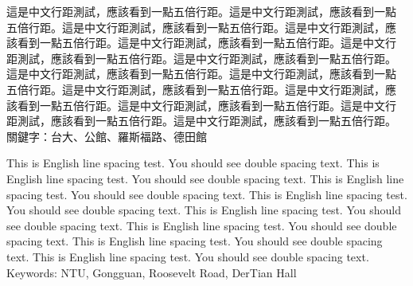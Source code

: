 \begin{abstractzh}
這是中文行距測試，應該看到一點五倍行距。這是中文行距測試，應該看到一點
五倍行距。這是中文行距測試，應該看到一點五倍行距。這是中文行距測試，應
該看到一點五倍行距。這是中文行距測試，應該看到一點五倍行距。這是中文行
距測試，應該看到一點五倍行距。這是中文行距測試，應該看到一點五倍行距。
這是中文行距測試，應該看到一點五倍行距。這是中文行距測試，應該看到一點
五倍行距。這是中文行距測試，應該看到一點五倍行距。這是中文行距測試，應
該看到一點五倍行距。這是中文行距測試，應該看到一點五倍行距。這是中文行
距測試，應該看到一點五倍行距。這是中文行距測試，應該看到一點五倍行距。 \\

\noindent
關鍵字：台大、公館、羅斯福路、德田館
\end{abstractzh}

\begin{abstracten}
This is English line spacing test. You should see double spacing text.
This is English line spacing test. You should see double spacing text.
This is English line spacing test. You should see double spacing text.
This is English line spacing test. You should see double spacing text.
This is English line spacing test. You should see double spacing text.
This is English line spacing test. You should see double spacing text.
This is English line spacing test. You should see double spacing text.
This is English line spacing test. You should see double spacing text. \\

\noindent
Keywords: NTU, Gongguan, Roosevelt Road, DerTian Hall
\end{abstracten}
